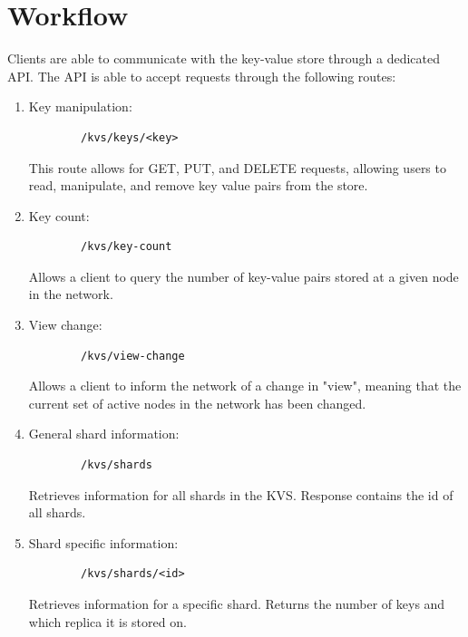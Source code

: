 \documentclass[12pt]{article}
\begin{document}
\section{Workflow}
Clients are able to communicate with the key-value store through a dedicated API. The API is able to accept requests through the following routes:
\begin{enumerate}
	\item Key manipulation:
	\begin{verbatim}
		/kvs/keys/<key>
	\end{verbatim}
	This route allows for GET, PUT, and DELETE requests, allowing users to read, manipulate, and remove key value pairs from the store.
	\item Key count:
	\begin{verbatim}
		/kvs/key-count
	\end{verbatim}
	Allows a client to query the number of key-value pairs stored at a given node in the network.
	\item View change:
	\begin{verbatim}
		/kvs/view-change
	\end{verbatim}
	Allows a client to inform the network of a change in "view", meaning that the current set of active nodes in the network has been changed.
	\item General shard information:
	\begin{verbatim}
		/kvs/shards
	\end{verbatim}
	Retrieves information for all shards in the KVS. Response contains the id of all shards.
	\item Shard specific information:
	\begin{verbatim}
		/kvs/shards/<id>
	\end{verbatim}
	Retrieves information for a specific shard. Returns the number of keys and which replica it is stored on.
\end{enumerate}
\end{document}
